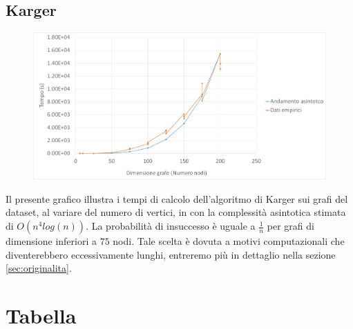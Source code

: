 \subsection{Karger\label{sec:karger}}
\begin{figure}[htp]
    \centering
    \includegraphics[width=\textwidth]{immagini/karger.jpg}
\end{figure}
Il presente grafico illustra i tempi di calcolo dell'algoritmo di Karger sui grafi del dataset, al variare del numero di vertici, in con la complessità asintotica stimata di \(O(n^{4}log(n))\). La probabilità di insuccesso è uguale a \(\frac{1}{n}\) per grafi di dimensione inferiori a $75$ nodi. Tale scelta è dovuta a motivi computazionali che diventerebbero eccessivamente lunghi, entreremo più in dettaglio nella sezione \vref{sec:originalita}. 

\clearpage

\section{Tabella\label{sec:tabella}}

